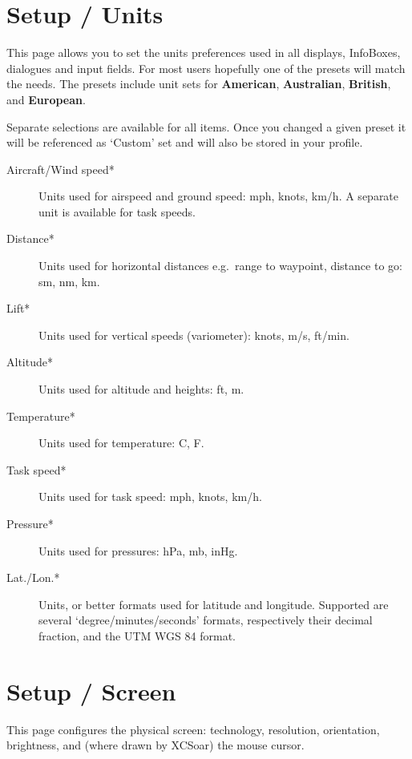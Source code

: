 \section{Setup / Units}

This page allows you to set the units preferences used in all
displays, InfoBoxes, dialogues and input fields.  
For most users hopefully one of the presets will match the needs.  The presets 
include unit sets for {\bf American}, {\bf Australian}, {\bf British}, 
and {\bf European}.

Separate selections are available for all items. Once you changed a given preset it 
will be referenced as `Custom' set and will also be stored in your profile.

\begin{description}
\item[Aircraft/Wind speed*]  Units used for airspeed and ground speed: mph, 
  knots, km/h. A separate unit is available for task speeds.
\item[Distance*]  Units used for horizontal distances e.g.\ range to waypoint,
  distance to go: sm, nm, km.
\item[Lift*]  Units used for vertical speeds (variometer): knots, m/s, ft/min.
\item[Altitude*] Units used for altitude and heights: ft, m.
\item[Temperature*]  Units used for temperature: \degree C, \degree F.
\item[Task speed*] Units used for task speed: mph, knots, km/h.
\item[Pressure*]  Units used for pressures: hPa, mb, inHg.
\item[Lat./Lon.*]  Units, or better formats used for latitude and longitude. 
  Supported are several `degree/minutes/seconds' formats, respectively 
  their decimal fraction, and the  UTM WGS 84 format.
\end{description}


\section{Setup / Screen}\label{sec:look-screen}
\label{sec:interface-display}

This page configures the physical screen: technology, resolution,
orientation, brightness, and (where drawn by XCSoar) the mouse cursor.

